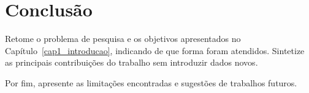 \chapter{Conclusão}
\label{cap5_conclusao}

Retome o problema de pesquisa e os objetivos apresentados no Capítulo~\ref{cap1_introducao}, indicando de que forma foram atendidos. Sintetize as principais contribuições do trabalho sem introduzir dados novos.

Por fim, apresente as limitações encontradas e sugestões de trabalhos futuros.
